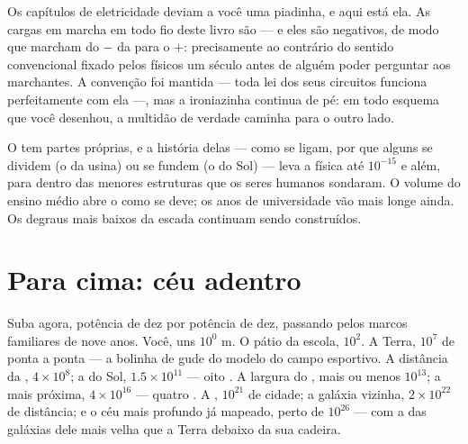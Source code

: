 \begin{example}\label{ex:g9:atoms-to-galaxies:electron}
Os capítulos de eletricidade deviam a você uma piadinha, e aqui está
ela. As cargas em marcha em todo fio deste livro são
\emph{} --- e eles são negativos, de modo que marcham do
 $-$ da  para o $+$: precisamente ao contrário do
sentido convencional fixado pelos físicos um século antes de alguém
poder perguntar aos marchantes. A convenção foi mantida --- toda lei
dos seus circuitos funciona perfeitamente com ela ---, mas a
ironiazinha continua de pé: em todo esquema que você desenhou, a
multidão de verdade caminha para o outro lado.
\end{example}

\begin{example}\label{ex:g9:atoms-to-galaxies:deeper}
O  tem partes próprias, e a história delas --- como se ligam,
por que alguns  se dividem (o  da usina) ou se fundem (o
do Sol) --- leva a física até $10^{-15}$  e além, para dentro
das menores estruturas que os seres humanos sondaram. O volume do
ensino médio abre o  como se deve; os anos de universidade vão
mais longe ainda. Os degraus mais baixos da escada continuam sendo
construídos.
\end{example}

\section{Para cima: céu adentro}

\begin{example}[A subida]\label{ex:g9:atoms-to-galaxies:ascent}
Suba agora, potência de dez por potência de dez, passando pelos
marcos familiares de nove anos. Você, uns $10^{0}$ \unit{m}. O pátio
da escola, $10^{2}$. A Terra, $10^{7}$ de ponta a ponta --- a bolinha
de gude do modelo do campo esportivo. A distância da ,
$4 \times 10^{8}$; a do Sol, $1.5 \times 10^{11}$ --- oito
. A largura do , mais ou menos $10^{13}$; a
 mais próxima, $4 \times 10^{16}$ --- quatro . A , $10^{21}$  de cidade; a galáxia vizinha,
$2 \times 10^{22}$ de distância; e o céu mais profundo já mapeado,
perto de $10^{26}$  --- com a  das galáxias dele mais velha
que a Terra debaixo da sua cadeira.
\end{example}

